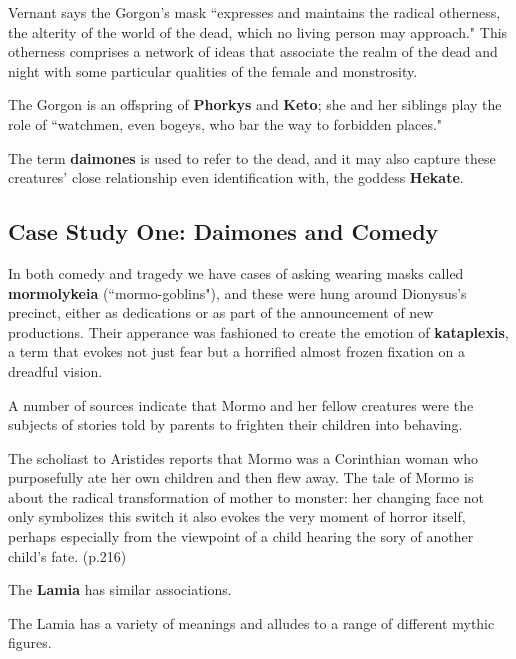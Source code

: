 Vernant says the Gorgon's mask ``expresses and maintains the radical otherness, the alterity of the world of the dead, which no living person may approach." This otherness comprises a network of ideas that associate the realm of the dead and night with some particular qualities of the female and monstrosity.

The Gorgon is an offspring of \textbf{Phorkys} and \textbf{Keto}; she and her siblings play the role of ``watchmen, even bogeys, who bar the way to forbidden places."

\begin{defn}
    The term \textbf{daimones} is used to refer to the dead, and it may also capture these creatures' close relationship even identification with, the goddess \textbf{Hekate}.
\end{defn}


\subsection{Case Study One: Daimones and Comedy}

In both comedy and tragedy we have cases of asking wearing masks called \textbf{mormolykeia} (``mormo-goblins"), and these were hung around Dionysus's precinct, either as dedications or as part of the announcement of new productions. Their apperance was fashioned to create the emotion of \textbf{kataplexis}, a term that evokes not just fear but a horrified almost frozen fixation on a dreadful vision.

\begin{rmk}
    A number of sources indicate that Mormo and her fellow creatures were the subjects of stories told by parents to frighten their children into behaving.
\end{rmk}

The scholiast to Aristides reports that Mormo was a Corinthian woman who purposefully ate her own children and then flew away. The tale of Mormo is about the radical transformation of mother to monster: her changing face not only symbolizes this switch it also evokes the very moment of horror itself, perhaps especially from the viewpoint of a child hearing the sory of another child's fate. (p.216)


The \textbf{Lamia} has similar associations.

\begin{nte}
    The Lamia has a variety of meanings and alludes to a range of different mythic figures.
\end{nte}

